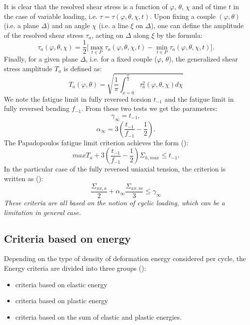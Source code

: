 It is clear that the resolved shear stress is a function of
$\varphi$, $\theta$, $\chi$ and of time $t$ in the case of variable loading, i.e. $\tau=\tau(\varphi, \theta, \chi, t)$. Upon fixing a couple $(\varphi, \theta)$ (i.e. a plane
$\Delta$) and an angle $\chi$ (i.e. a line $\xi$ on $\Delta$), one can define the amplitude of the resolved shear stress $\tau_a$, acting on $\Delta$
along $\xi$ by the formula:
\begin{equation}
\tau_a(\varphi,\theta,\chi)=\frac{1}{2}\big[\max \limits_{t\in P}\tau_a(\varphi,\theta,\chi ,t)-\min \limits_{t\in P}\tau_a(\varphi,\theta,\chi ,t)\big].
\end{equation}
Finally, for a given plane $\Delta$, i.e. for a fixed couple ($\varphi$, $\theta$),
the generalized shear stress amplitude $T_a$ is defined as:
\begin{equation}
T_a(\varphi,\theta)=\sqrt{\frac{1}{\pi}\int_{x=0}^{\frac{\pi}{2}} \tau_a^2(\varphi,\theta,\chi)d\chi}
\label{Ta}
\end{equation}
We note the fatigue limit in fully reversed torsion $t_{-1}$ and the fatigue limit in fully reversed bending $f_{-1}$. From these two tests we get the parameters:
$$\gamma_\infty=t_{-1},$$ 
$$\alpha_\infty=3\left( \frac{t_{-1}}{f_{-1}}-\frac{1}{2}\right) .$$
The Papadopoulos fatigue limit criterion achieves the form (\cite{papadopoulos2001long}):
\begin{equation}
maxT_a+3\left( \frac{t_{-1}}{f_{-1}}-\frac{1}{2}\right) \Sigma_{h,max}\leqslant t_{-1}.
\label{eq:papadopoulos}
\end{equation}
In the particular case of the fully reversed uniaxial tension, the criterion is written as (\cite{papadopoulos2001long}):
$$\dfrac{\Sigma_{xx,a}}{2}+\alpha_\infty\dfrac{\Sigma_{xx,m}}{3} \leqslant\gamma_\infty$$
\textit{These criteria are all based on the notion of cyclic loading, which can be a limitation in general case.}
\subsection{Criteria based on energy}
Depending on the type of density of deformation energy considered per cycle, the
Energy criteria are divided into three groups (\cite{macha1999energy}):
\begin{itemize}
	\item  criteria based on elastic energy
	\item  criteria based on plastic energy
	\item  criteria based on the sum of elastic and plastic energies.
\end{itemize}

